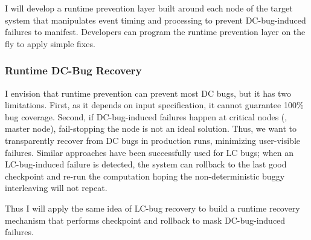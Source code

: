 \documentclass[11pt]{article}
\begin{document}
I will develop a runtime prevention layer built around each node of the target
system that manipulates event timing and processing to prevent DC-bug-induced
failures to manifest. Developers can program the runtime prevention layer on the
fly to apply simple fixes.

\subsubsection*{Runtime DC-Bug Recovery}

I envision that runtime prevention can prevent most DC bugs, but it has two
limitations. First, as it depends on input specification, it cannot guarantee
100\% bug coverage. Second, if DC-bug-induced failures happen at critical nodes
(\eg, master node), fail-stopping the node is not an ideal solution. Thus, we
want to transparently recover from DC bugs in production runs, minimizing
user-visible failures. Similar approaches have been successfully used for LC
bugs; when an LC-bug-induced failure is detected, the system can rollback to
the last good checkpoint and re-run the computation hoping the
non-deterministic buggy interleaving will not repeat.

Thus I will apply the same idea of LC-bug recovery to build a runtime recovery
mechanism that performs checkpoint and rollback to mask DC-bug-induced failures.

\end{document}
